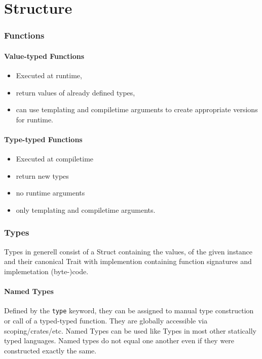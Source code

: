 \documentclass{scrartcl}
\begin{document}

\part{Structure}

\section{Functions}

\subsection{Value-typed Functions}
\begin{itemize}
		\item Executed at runtime,
		\item return values of already defined types,
		\item can use templating and compiletime arguments to create appropriate versions for runtime.
\end{itemize}

\subsection{Type-typed Functions}
\begin{itemize}
		\item Executed at compiletime
		\item return new types
		\item no runtime arguments
		\item only templating and compiletime arguments.
\end{itemize}

\section{Types}
Types in generell consist of a Struct containing the values, of the given instance and their canonical Trait with implemention containing function signatures and implemetation (byte-)code.

\subsection{Named Types}
Defined by the \texttt{type} keyword, they can be assigned to manual type construction or call of a typed-typed function. They are globally accessible via scoping/crates/etc. Named Types can be used like Types in most other statically typed languages. Named types do not equal one another even if they were constructed exactly the same.
\end{document}
